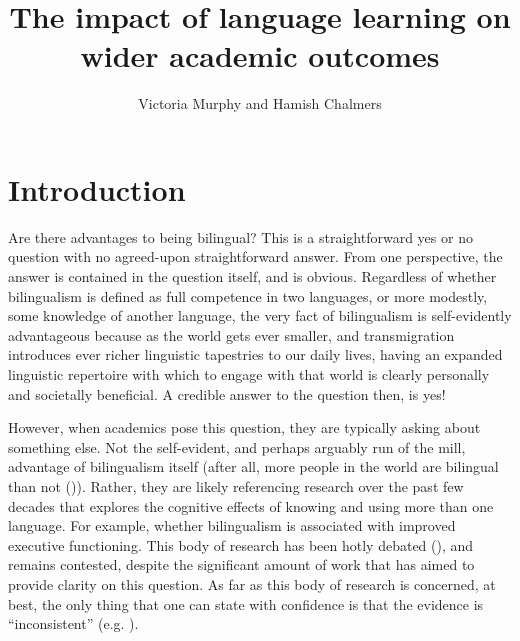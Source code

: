 \documentclass[output=paper]{langscibook}
\author{Victoria Murphy\orcid{}\affiliation{University of Oxford} and Hamish Chalmers\orcid{}\affiliation{University of Oxford}}
\title{The impact of language learning on wider academic outcomes}
\begin{document}
\maketitle 


\section{Introduction}

Are there advantages to being bilingual? This is a straightforward yes or no question with no agreed-upon straightforward answer. From one perspective, the answer is contained in the question itself, and is obvious. Regardless of whether bilingualism is defined as full competence in two languages, or more modestly, some knowledge of another language, the very fact of bilingualism is self-ev\-i\-dent\-ly advantageous because as the world gets ever smaller, and transmigration introduces ever richer linguistic tapestries to our daily lives, having an expanded linguistic repertoire with which to engage with that world is clearly personally and societally beneficial. A credible answer to the question then, is yes! 


However, when academics pose this question, they are typically asking about something else. Not the self-evident, and perhaps arguably run of the mill, advantage of bilingualism itself (after all, more people in the world are bilingual than not (\citealt{Grosjean2010,Grosjean2014,BialystokEtAl2012})). Rather, they are likely referencing research over the past few decades that explores the cognitive effects of knowing and using more than one language. For example, whether bilingualism is associated with improved executive functioning. This body of research has been hotly debated (\citealt{BialystokEtAl2012,PaapGreenberg2013,DeBruinEtAl2015,Friedman2016}), and remains contested, despite the significant amount of work that has aimed to provide clarity on this question. As far as this body of research is concerned, at best, the only thing that one can state with confidence is that the evidence is ``inconsistent'' (e.g. \citealt{WollWei2019}).
\end{document}
